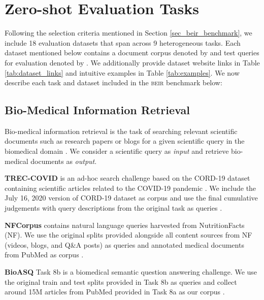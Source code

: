 \documentclass{article}
\newcommand{\custo}[1]{\textsc{\normalsize #1}}
\newcommand{\beir}{\custo{beir}\xspace}
\begin{document}
\vspace{-2mm}
\section{Zero-shot Evaluation Tasks}\label{sec:datasets}
\vspace{-2mm}

Following the selection criteria mentioned in Section \ref{sec_beir_benchmark}, we include 18 evaluation datasets that span across 9 heterogeneous tasks. Each dataset mentioned below contains a document corpus denoted by  and test queries for evaluation denoted by . We additionally provide dataset website links in Table \ref{tab:dataset_links} and intuitive examples in Table \ref{tab:examples}. We now describe each task and dataset included in the \beir benchmark below:

\vspace{-2mm}
\subsection{Bio-Medical Information Retrieval}
\vspace{-2mm}
Bio-medical information retrieval is the task of searching relevant scientific documents such as research papers or blogs for a given scientific query in the biomedical domain \cite{jiang2007empirical}. We consider a scientific query as \textit{input} and retrieve bio-medical documents as \textit{output}.

\textbf{TREC-COVID} \cite{10.1145/3451964.3451965} is an ad-hoc search challenge based on the CORD-19 dataset containing scientific articles related to the COVID-19 pandemic \cite{wang2020cord19}. We include the July 16, 2020 version of CORD-19 dataset as corpus  and use the final cumulative judgements with query descriptions from the original task as queries .

\textbf{NFCorpus} \cite{boteva2016} contains natural language queries harvested from NutritionFacts (NF). We use the original splits provided alongside all content sources from NF (videos, blogs, and Q\&A posts) as queries  and annotated medical documents from PubMed as corpus .

\textbf{BioASQ} \cite{tsatsaronis2015overview} Task 8b is a biomedical semantic question answering challenge. We use the original train and test splits provided in Task 8b as queries  and collect around 15M articles from PubMed provided in Task 8a as our corpus . 

\vspace{-1mm}
\end{document}
